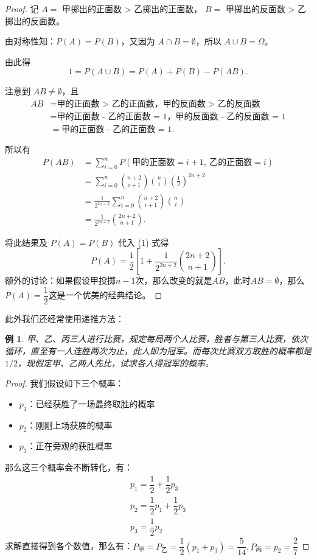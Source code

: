 \documentclass[a4paper]{ctexart}
\newtheorem{example}{例}[section]
\begin{document}
\begin{proof}
    记 \( A = \) 甲掷出的正面数 > 乙掷出的正面数，  
        \( B = \) 甲掷出的反面数 > 乙掷出的反面数。

    由对称性知：\( P(A) = P(B) \)，又因为 \( A \cap B = \emptyset \)，所以 \( A \cup B = \Omega \)。

    由此得
    \[
    1 = P(A \cup B) = P(A) + P(B) - P(AB). \tag{1}
    \]

    注意到 \( AB \neq \emptyset \)，且
    \[
    \begin{aligned}
    AB &= \text{甲的正面数 > 乙的正面数，甲的反面数 > 乙的反面数} \\
    &= \text{甲的正面数 - 乙的正面数 = 1，甲的反面数 - 乙的反面数 = 1} \\
    &= \text{甲的正面数 - 乙的正面数 = 1}.
    \end{aligned}
    \]

    所以有
    \[
    \begin{aligned}
    P(AB) &= \sum_{i=0}^n P(\text{甲的正面数} = i + 1,\ \text{乙的正面数} = i) \\
    &= \sum_{i=0}^n \binom{n+2}{i+1} \binom{n}{i} \left( \frac{1}{2} \right)^{2n+2} \\
    &= \frac{1}{2^{2n+2}} \sum_{i=0}^n \binom{n+2}{i+1} \binom{n}{i} \\
    &= \frac{1}{2^{2n+2}} \binom{2n+2}{n+1}.
    \end{aligned}
    \]

    将此结果及 \( P(A) = P(B) \) 代入 (1) 式得
    \[
    P(A) = \frac{1}{2} \left[ 1 + \frac{1}{2^{2n+2}} \binom{2n+2}{n+1} \right].
    \]
    额外的讨论：如果假设甲投掷$n-1$次，那么改变的就是$AB$，此时$AB=\emptyset$，那么$P(A)=\dfrac{1}{2}$这是一个优美的经典结论。
\end{proof}
此外我们还经常使用递推方法：
\begin{example}
    甲、乙、丙三人进行比赛，规定每局两个人比赛，胜者与第三人比赛，依次循环，直至有一人连胜两次为止，此人即为冠军。而每次比赛双方取胜的概率都是 \(1/2\)，现假定甲、乙两人先比，试求各人得冠军的概率。
\end{example}
\begin{proof}
    我们假设如下三个概率：
    \begin{itemize}
        \item $p_1$：已经获胜了一场最终取胜的概率
        \item $p_2$：刚刚上场获胜的概率
        \item $p_3$：正在旁观的获胜概率
    \end{itemize}
    那么这三个概率会不断转化，有：
    \begin{equation*}
        \begin{aligned}
            p_1=\dfrac{1}{2}+\dfrac{1}{2} p_3\\
            p_2=\dfrac{1}{2}p_1+\dfrac{1}{2} p_3\\
            p_3=\dfrac{1}{2}p_2
        \end{aligned}
    \end{equation*}
    求解直接得到各个数值，那么有：$P_{\text{甲}}=P_{\text{乙}}=\dfrac{1}{2}(p_1+p_3)=\dfrac{5}{14},P_{\text{丙}}=p_2=\dfrac{2}{7}$
\end{proof}
\end{document}

